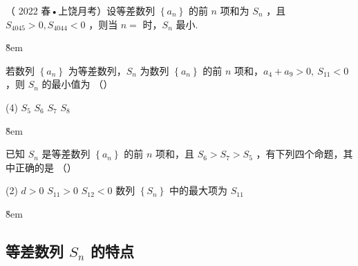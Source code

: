 \begin{example}
    （ 2022 春•上饶月考）设等差数列 $\left\{a_n\right\}$ 的前 $n$ 项和为 $S_n$ ，且 $S_{4045}>0, S_{4044}<0$ ，则当 $n=$ \underline{\qquad} 时，$S_n$ 最小.
\end{example}

\v{8em}

\begin{example}
    若数列 $\left\{a_n\right\}$ 为等差数列，$S_n$ 为数列 $\left\{a_n\right\}$ 的前 $n$ 项和，$a_4+a_9>0, ~ S_{11}<0$ ，则 $S_n$ 的最小值为 （\qquad）
    \begin{tasks}(4)
        \task $S_5$
        \task $S_6$
        \task $S_7$
        \task $S_8$
    \end{tasks}
\end{example}

\v{8em}

\begin{example}
    已知 $S_n$ 是等差数列 $\left\{a_n\right\}$ 的前 $n$ 项和，且 $S_6>S_7>S_5$ ，有下列四个命题，其中正确的是 （\qquad）
    \begin{tasks}(2)
        \task $d>0$
        \task $S_{11}>0$
        \task $S_{12}<0$
        \task 数列 $\left\{S_n\right\}$ 中的最大项为 $S_{11}$
    \end{tasks}
\end{example}

\v{8em}

\subsection{等差数列 $S_n$ 的特点}

